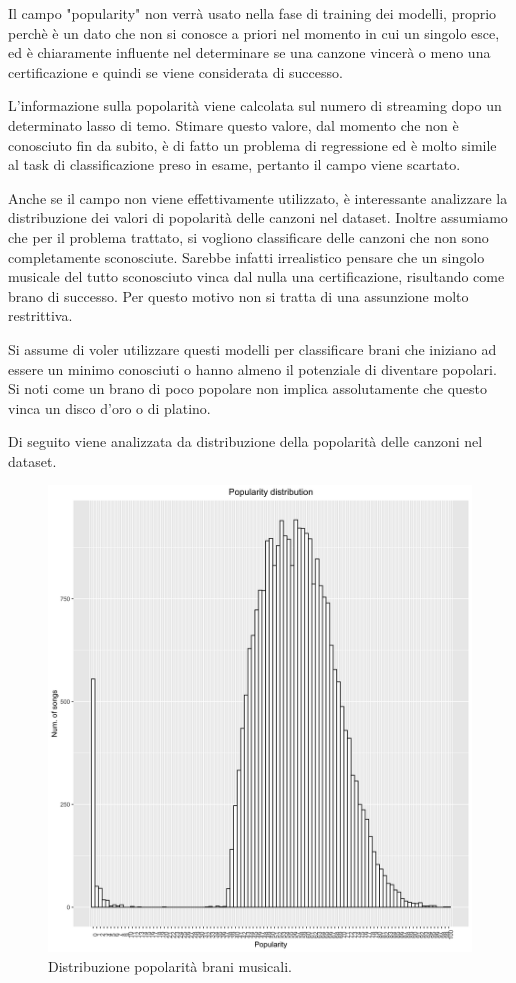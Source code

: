 Il campo "popularity" non verrà usato nella fase di training dei modelli, proprio perchè è un dato che non si conosce a priori nel momento in cui un singolo esce, ed è chiaramente influente nel determinare se una canzone vincerà o meno una certificazione e quindi se viene considerata di successo. 

L'informazione sulla popolarità viene calcolata sul numero di streaming dopo un determinato lasso di temo. Stimare questo valore, dal momento che non è conosciuto fin da subito, è di fatto un problema di regressione ed è molto simile al task di classificazione preso in esame, pertanto il campo viene scartato.

Anche se il campo non viene effettivamente utilizzato, è interessante analizzare la distribuzione dei valori di popolarità delle canzoni nel dataset. Inoltre assumiamo che per il problema trattato, si vogliono classificare delle canzoni che non sono completamente sconosciute. Sarebbe infatti irrealistico pensare che un singolo musicale del tutto sconosciuto vinca dal nulla una certificazione, risultando come brano di successo.  Per questo motivo non si tratta di una assunzione molto restrittiva.

Si assume di voler utilizzare questi modelli per classificare brani che iniziano ad essere un minimo conosciuti o hanno almeno il potenziale di diventare popolari. Si noti come un brano di poco popolare non implica assolutamente che questo vinca un disco d'oro o di platino.

Di seguito viene analizzata da distribuzione della popolarità delle canzoni nel dataset.


\begin{figure}[H]
	\centering
	\includegraphics[width=13cm]{../images/popularity_distribution.png}
	\caption{Distribuzione popolarità brani musicali.}
\end{figure}

